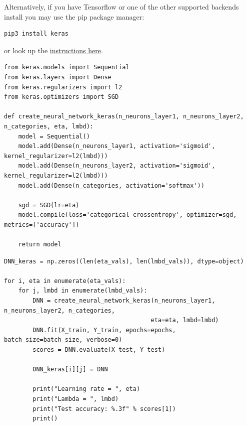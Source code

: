 \documentclass[%
oneside,                 %
final,                   %
10pt]{article}
\begin{document}
Alternatively, if you have Tensorflow or one of the other supported backends install you may use the pip package manager: 

\begin{verbatim}
pip3 install keras
\end{verbatim}
or look up the \href{{https://keras.io/}}{instructions here}.

\begin{verbatim}
from keras.models import Sequential
from keras.layers import Dense
from keras.regularizers import l2
from keras.optimizers import SGD

def create_neural_network_keras(n_neurons_layer1, n_neurons_layer2, n_categories, eta, lmbd):
    model = Sequential()
    model.add(Dense(n_neurons_layer1, activation='sigmoid', kernel_regularizer=l2(lmbd)))
    model.add(Dense(n_neurons_layer2, activation='sigmoid', kernel_regularizer=l2(lmbd)))
    model.add(Dense(n_categories, activation='softmax'))
    
    sgd = SGD(lr=eta)
    model.compile(loss='categorical_crossentropy', optimizer=sgd, metrics=['accuracy'])
    
    return model
\end{verbatim}

\begin{verbatim}
DNN_keras = np.zeros((len(eta_vals), len(lmbd_vals)), dtype=object)
        
for i, eta in enumerate(eta_vals):
    for j, lmbd in enumerate(lmbd_vals):
        DNN = create_neural_network_keras(n_neurons_layer1, n_neurons_layer2, n_categories,
                                         eta=eta, lmbd=lmbd)
        DNN.fit(X_train, Y_train, epochs=epochs, batch_size=batch_size, verbose=0)
        scores = DNN.evaluate(X_test, Y_test)
        
        DNN_keras[i][j] = DNN
        
        print("Learning rate = ", eta)
        print("Lambda = ", lmbd)
        print("Test accuracy: %.3f" % scores[1])
        print()
\end{verbatim}
\end{document}
